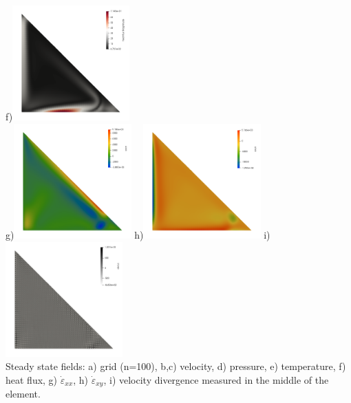\begin{center}
f)\includegraphics[width=4.5cm]{python_codes/fieldstone_51/images/relax0p20_100/heatflux}\\
g)\includegraphics[width=4.5cm]{python_codes/fieldstone_51/images/relax0p20_100/exx}
h)\includegraphics[width=4.5cm]{python_codes/fieldstone_51/images/relax0p20_100/exy}
i)\includegraphics[width=4.5cm]{python_codes/fieldstone_51/images/relax0p20_100/divv}\\
{\small Steady state fields: a) grid (n=100), b,c) velocity, d) pressure, e) temperature,
f) heat flux, g) $\dot{\varepsilon}_{xx}$, h) $\dot{\varepsilon}_{xy}$, i) velocity 
divergence measured in the middle of the element.}
\end{center}




